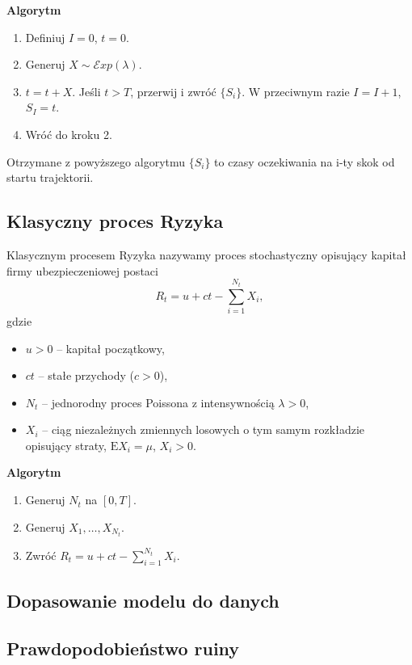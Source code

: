 \documentclass[12pt]{mwart}
\begin{document}
	\noindent \textbf{Algorytm}
	\begin{enumerate}
		\item Definiuj $I = 0$, $t=0$.
		\item Generuj $X \sim \mathcal{E}xp(\lambda)$.
		\item $t = t + X$. Jeśli $t > T$, przerwij i zwróć $\{S_i\}$. W przeciwnym razie $I = I + 1$, $S_I = t$.
		\item Wróć do kroku 2.
	\end{enumerate}
	Otrzymane z powyższego algorytmu $\{S_i\}$ to czasy oczekiwania na i-ty skok od startu trajektorii.
	
	
	\subsection{Klasyczny proces Ryzyka}
	\noindent Klasycznym procesem Ryzyka nazywamy proces stochastyczny opisujący kapitał firmy ubezpieczeniowej postaci
	$$ R_t = u + ct - \sum_{i=1}^{N_t} X_i, $$
	gdzie
	\begin{itemize}[label=\textbf{.}]
		\item $u > 0$ -- kapitał początkowy,
		\item $ct$ -- stałe przychody ($c > 0$),
		\item $N_t$ -- jednorodny proces Poissona z intensywnością $\lambda > 0$,
		\item $X_i$ -- ciąg niezależnych zmiennych losowych o tym samym rozkładzie opisujący straty, $\mathrm{E}X_i = \mu$, $X_i > 0$.
	\end{itemize}

	\noindent \textbf{Algorytm}
	\begin{enumerate}
		\item Generuj $N_t$ na $[0, T]$.
		\item Generuj $X_1, \dots, X_{N_t}$.
		\item Zwróć $R_t = u + ct - \sum_{i=1}^{N_t} X_i$.
	\end{enumerate}
	
	
	\subsection{Dopasowanie modelu do danych}
	
	\subsection{Prawdopodobieństwo ruiny}
	
	
	
\end{document}
